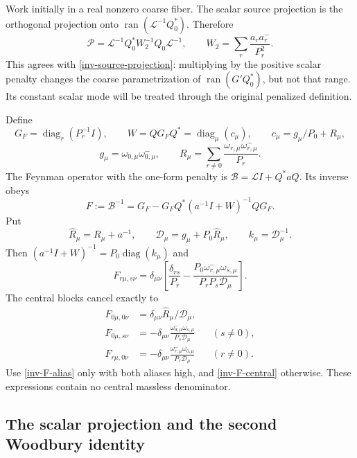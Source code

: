 \documentclass[11pt]{article}
\theoremstyle{remark}
\newcommand{\diag}{\operatorname{diag}}
\begin{document}
Work initially in a real nonzero coarse fiber. The scalar source
projection is the orthogonal projection onto
$\operatorname{ran}(\mathcal L^{-1}Q_0^*)$. Therefore
\begin{equation}\label{inv-projection-alias}
 \mathcal P=\mathcal L^{-1}Q_0^*W_2^{-1}Q_0\mathcal L^{-1},
 \qquad W_2=\sum_r\frac{a_ra_r^-}{P_r^2}.
\end{equation}
This agrees with \eqref{inv-source-projection}: multiplying by the
positive scalar penalty changes the coarse parametrization of
$\operatorname{ran}(G'Q_0^*)$, but not that range. Its constant scalar
mode will be treated through the original penalized definition.

Define
\[
 G_F=\diag_r(P_r^{-1}I),\qquad
 W=QG_FQ^*=\diag_\mu(c_\mu),\qquad
 c_\mu=g_\mu/P_0+R_\mu,
\]
\[
 g_\mu=\omega_{0,\mu}\omega_{0,\mu}^-,\qquad
 R_\mu=\sum_{r\ne0}\frac{\omega_{r,\mu}\omega_{r,\mu}^-}{P_r}.
\]
The Feynman operator with the one-form penalty is
$\mathcal B=\mathcal L I+Q^*aQ$. Its inverse obeys
\begin{equation}\label{inv-F-woodbury}
 F:=\mathcal B^{-1}
 =G_F-G_FQ^*(a^{-1}I+W)^{-1}QG_F.
\end{equation}
Put
\begin{equation}\label{inv-Da}
 \widehat R_\mu=R_\mu+a^{-1},\qquad
 \mathcal D_\mu=g_\mu+P_0\widehat R_\mu,\qquad
 k_\mu=\mathcal D_\mu^{-1}.
\end{equation}
Then $(a^{-1}I+W)^{-1}=P_0\diag(k_\mu)$ and
\begin{equation}\label{inv-F-alias}
 F_{r\mu,s\nu}=\delta_{\mu\nu}
 \left[\frac{\delta_{rs}}{P_r}
 -\frac{P_0\omega_{r,\mu}^-\omega_{s,\mu}}
              {P_rP_s\mathcal D_\mu}\right].
\end{equation}
The central blocks cancel exactly to
\begin{align}
 F_{0\mu,0\nu}
 &=\delta_{\mu\nu}\widehat R_\mu/\mathcal D_\mu,
 \label{inv-F-central}\\
 F_{0\mu,s\nu}
 &=-\delta_{\mu\nu}
   \frac{\omega_{0,\mu}^-\omega_{s,\mu}}{P_s\mathcal D_\mu}
       &&(s\ne0),\nonumber\\
 F_{r\mu,0\nu}
 &=-\delta_{\mu\nu}
   \frac{\omega_{r,\mu}^-\omega_{0,\mu}}{P_r\mathcal D_\mu}
       &&(r\ne0).\nonumber
\end{align}
Use \eqref{inv-F-alias} only with both aliases high, and
\eqref{inv-F-central} otherwise. These expressions contain no
central massless denominator.

\subsection{The scalar projection and the second Woodbury identity}
\end{document}

